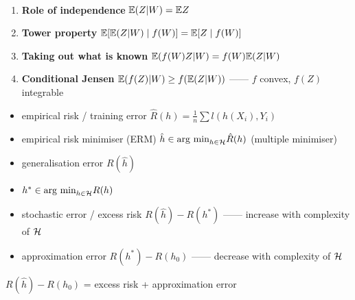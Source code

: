 \begin{prop}\,
    \begin{enumerate}
        \item \textbf{Role of independence} $\mathbb{E}(Z|W) = \mathbb{E} Z$
        \item \textbf{Tower property} $\mathbb{E}{[\mathbb{E}(Z|W)\mid f(W)]} = \mathbb{E} [Z\mid f(W)]$
        \item \textbf{Taking out what is known} $\mathbb{E}(f(W)Z|W) = f(W)\mathbb{E} (Z | W)$
        \item \textbf{Conditional Jensen} $\mathbb{E}(f(Z)|W) \geq f(\mathbb{E} (Z | W))$ ------ $f$ convex, $f(Z)$ integrable
    \end{enumerate}
\end{prop}

\begin{itemize}
    \item empirical risk / training error $\hat R(h) = \frac{1}{n} \sum l(h(X_i), Y_i)$
    \item empirical risk minimiser (ERM) $\hat h \in \textnormal{arg min}_{h \in \mathcal{H}} \hat R(h)$ (multiple minimiser)
    \item generalisation error $R(\hat h)$
    \item $h^* \in \textnormal{arg min}_{h \in \mathcal{H}} R(h)$
    \item stochastic error / excess risk $R(\hat h) - R(h^*)$ ------ increase with complexity of $\mathcal{H}$
    \item approximation error $R(h^*) - R(h_0)$ ------ decrease with complexity of $\mathcal{H}$
\end{itemize}

\begin{fact}
    $R(\hat h) - R(h_0)$ = excess risk + approximation error
\end{fact}

